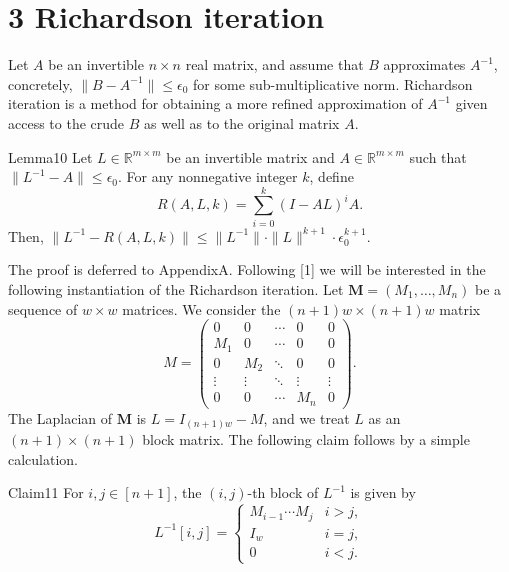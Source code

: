 \section*{3 Richardson iteration}
Let $A$ be an invertible $n\times n$ real matrix, and assume that $B$ approximates $A^{-1}$, concretely, $\|B-A^{-1}\|\le\epsilon_0$ for some sub-multiplicative norm. Richardson iteration is a method for obtaining a more refined approximation of $A^{-1}$ given access to the crude $B$ as well as to the original matrix $A$.
\begin{authorclaim}{Lemma10}
Let $L\in\mathbb R^{m\times m}$ be an invertible matrix and $A\in\mathbb R^{m\times m}$ such that $\|L^{-1}-A\|\le\epsilon_0$. For any nonnegative integer $k$, define
\[R(A,L,k)=\sum_{i=0}^k(I-AL)^iA.\]
Then, $\|L^{-1}-R(A,L,k)\|\le\|L^{-1}\|\cdot\|L\|^{k+1}\cdot\epsilon_0^{k+1}$.
\end{authorclaim}
The proof is deferred to AppendixA.
Following [1] we will be interested in the following instantiation of the Richardson iteration. Let $\mathbf M=(M_1,\ldots,M_n)$ be a sequence of $w\times w$ matrices. We consider the $(n+1)w\times(n+1)w$ matrix
\begin{equation}\tag{4}M=\begin{pmatrix}0&0&\cdots&0&0\\M_1&0&\cdots&0&0\\0&M_2&\ddots&0&0\\\vdots&\vdots&\ddots&\vdots&\vdots\\0&0&\cdots&M_n&0\end{pmatrix}.\end{equation}
The Laplacian of $\mathbf M$ is $L=I_{(n+1)w}-M$, and we treat $L$ as an $(n+1)\times(n+1)$ block matrix. The following claim follows by a simple calculation.
\begin{authorclaim}{Claim11}
For $i,j\in[n+1]$, the $(i,j)$-th block of $L^{-1}$ is given by
\[L^{-1}[i,j]=\begin{cases}M_{i-1}\cdots M_j&i>j,\\I_w&i=j,\\0&i<j.\end{cases}\]
\end{authorclaim}
